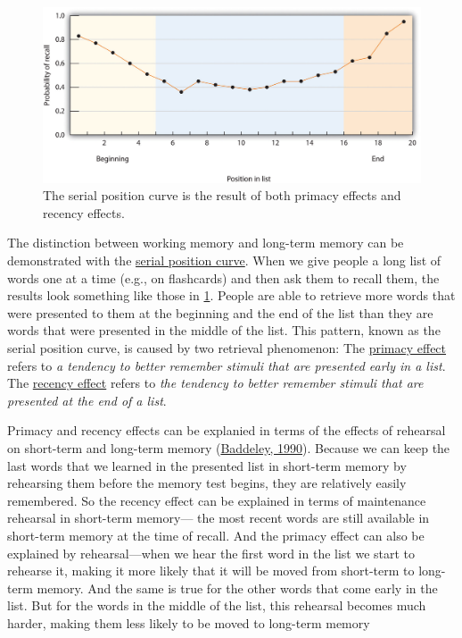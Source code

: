 \documentclass[
]{krantz}
\begin{document}
\begin{figure}

{\centering \includegraphics[width=0.8\linewidth]{images/ch5/fig1} 

}

\caption{The serial position curve is the result of both primacy effects and recency effects.}\label{fig:serialposition}
\end{figure}

The distinction between working memory and long-term memory can be demonstrated with the \protect\hyperlink{serial-position-curve}{serial position curve}. When we give people a long list of words one at a time (e.g., on flashcards) and then ask them to recall them, the results look something like those in \ref{fig:serialposition}. People are able to retrieve more words that were presented to them at the beginning and the end of the list than they are words that were presented in the middle of the list. This pattern, known as the serial position curve, is caused by two retrieval phenomenon: The \protect\hyperlink{primacy-effect}{primacy effect} refers to \emph{a tendency to better remember stimuli that are presented early in a list}. The \protect\hyperlink{recency-effect}{recency effect} refers to \emph{the tendency to better remember stimuli that are presented at the end of a list}.

Primacy and recency effects can be explanied in terms of the effects of rehearsal on short-term and long-term memory (\protect\hyperlink{ref-Baddeley1990}{Baddeley, 1990}). Because we can keep the last words that we learned in the presented list in short-term memory by rehearsing them before the memory test begins, they are relatively easily remembered. So the recency effect can be explained in terms of maintenance rehearsal in short-term memory--- the most recent words are still available in short-term memory at the time of recall. And the primacy effect can also be explained by rehearsal---when we hear the first word in the list we start to rehearse it, making it more likely that it will be moved from short-term to long-term memory. And the same is true for the other words that come early in the list. But for the words in the middle of the list, this rehearsal becomes much harder, making them less likely to be moved to long-term memory
\end{document}
